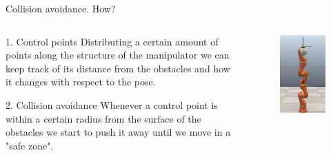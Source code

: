 \documentclass[11pt]{beamer}
\begin{document}
\begin{frame}{Collision avoidance. How?}
\begin{columns}
\begin{column}{.5\textwidth}
\begin{block}{1. Control points}
Distributing a certain amount of points along the structure of the manipulator we can keep track of its distance from the obstacles and how it changes with respect to the pose.
\end{block}
\begin{block}{2. Collision avoidance}
Whenever a control point is within a certain radius from the surface of the obstacles we start to push it away until we move in a "safe zone".
\end{block}
\end{column}
\begin{column}{.5\textwidth}
\begin{figure}[H]
\includegraphics[scale=.25]{./images/KUKA_CPS.png}

\end{figure}
\end{column}
\end{columns}
\end{frame}
\end{document}
